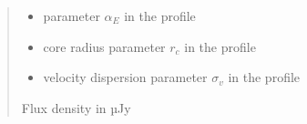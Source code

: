 \documentclass[letterpaper,10pt,english]{sphinxmanual}
\begin{document}
\begin{fulllineitems}
\begin{quote}
\begin{description}
\begin{itemize}
\item {} 
\sphinxAtStartPar
{} \textendash{} parameter \(\alpha_E\) in the {\hyperref[\detokenize{diffsph.profiles:diffsph.profiles.templates.enst}]{}} profile

\item {} 
\sphinxAtStartPar
{} \textendash{} core radius parameter \(r_c\) in the {\hyperref[\detokenize{diffsph.profiles:diffsph.profiles.templates.cnfw}]{}} profile

\item {} 
\sphinxAtStartPar
{} \textendash{} velocity dispersion parameter \(\sigma_v\) in the {\hyperref[\detokenize{diffsph.profiles:diffsph.profiles.templates.sis}]{}} profile

\end{itemize}

\sphinxAtStartPar
Flux density in µJy

\end{description}\end{quote}

\end{fulllineitems}

\end{document}

